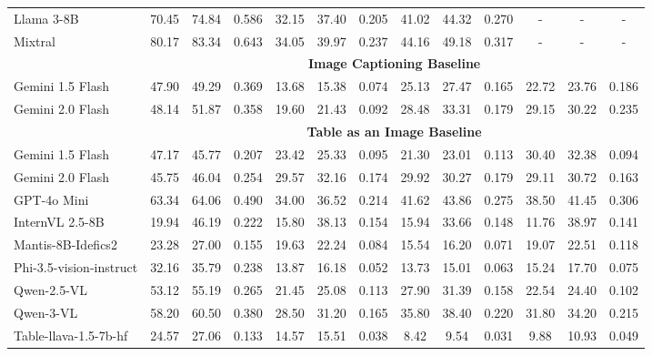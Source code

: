 \documentclass[11pt]{article}
\begin{document}
\begin{table}[h]
\begin{tabular}{lccc|ccc|ccc|ccc}
Llama 3-8B      & 70.45 & 74.84 & 0.586 & 32.15 & 37.40 & 0.205 & 41.02 & 44.32 & 0.270 & - & - & - \\
Mixtral    & \cellcolor{yellow}80.17 & \cellcolor{yellow}83.34 & \cellcolor{yellow}0.643 & 34.05 & 39.97 & 0.237 & 44.16 & 49.18 & 0.317 & - & - & - \\
\cmidrule{2-13}
& \multicolumn{12}{c}{\textbf{Image Captioning Baseline}} \\
\cmidrule{2-13}
Gemini 1.5 Flash & 47.90 & 49.29 & \cellcolor{yellow}0.369 & 13.68 & 15.38 & 0.074 & 25.13 & 27.47 & 0.165 & 22.72 & 23.76 & 0.186 \\
Gemini 2.0 Flash & \cellcolor{yellow}48.14 & \cellcolor{yellow}51.87 & 0.358 & \cellcolor{yellow}19.60 & \cellcolor{yellow}21.43 & \cellcolor{yellow}0.092 & \cellcolor{yellow}28.48 & \cellcolor{yellow}33.31 & \cellcolor{yellow}0.179 & \cellcolor{yellow}29.15 & \cellcolor{yellow}30.22 & \cellcolor{yellow}0.235 \\
\cmidrule{2-13}
& \multicolumn{12}{c}{\textbf{Table as an Image Baseline}} \\
\cmidrule{2-13}
Gemini 1.5 Flash & 47.17 & 45.77 & 0.207 & 23.42 & 25.33 & 0.095 & 21.30 & 23.01 & 0.113 & 30.40 & 32.38 & 0.094 \\
Gemini 2.0 Flash & 45.75 & 46.04 & 0.254 & 29.57 & 32.16 & 0.174 & 29.92 & 30.27 & 0.179 & 29.11 & 30.72 & 0.163 \\
GPT-4o Mini      & \cellcolor{yellow}63.34 & \cellcolor{yellow}64.06 & \cellcolor{yellow}0.490 & \cellcolor{yellow}34.00 & 36.52 & \cellcolor{yellow}0.214 & \cellcolor{yellow}41.62 & \cellcolor{yellow}43.86 & \cellcolor{yellow}0.275 & \cellcolor{yellow}38.50 & \cellcolor{yellow}41.45 & \cellcolor{yellow}0.306 \\
InternVL 2.5-8B  & 19.94 & 46.19 & 0.222 & 15.80 & \cellcolor{yellow}38.13 & 0.154 & 15.94 & 33.66 & 0.148 & 11.76 & 38.97 & 0.141 \\
Mantis-8B-Idefics2 & 23.28 & 27.00 & 0.155 & 19.63 & 22.24 & 0.084 & 15.54 & 16.20 & 0.071 & 19.07 & 22.51 & 0.118 \\
Phi-3.5-vision-instruct & 32.16 & 35.79 & 0.238 & 13.87 & 16.18 & 0.052 & 13.73 & 15.01 & 0.063 & 15.24 & 17.70 & 0.075 \\
Qwen-2.5-VL & 53.12 & 55.19 & 0.265 & 21.45 & 25.08 & 0.113 & 27.90 & 31.39 & 0.158 & 22.54 & 24.40 & 0.102 \\
Qwen-3-VL        & 58.20 & 60.50 & 0.380 & 28.50 & 31.20 & 0.165 & 35.80 & 38.40 & 0.220 & 31.80 & 34.20 & 0.215 \\
Table-llava-1.5-7b-hf & 24.57 & 27.06 & 0.133 & 14.57 & 15.51 & 0.038 & 8.42 & 9.54 & 0.031 & 9.88 & 10.93 & 0.049 \\

\end{tabular}
\end{table}
\end{document}
